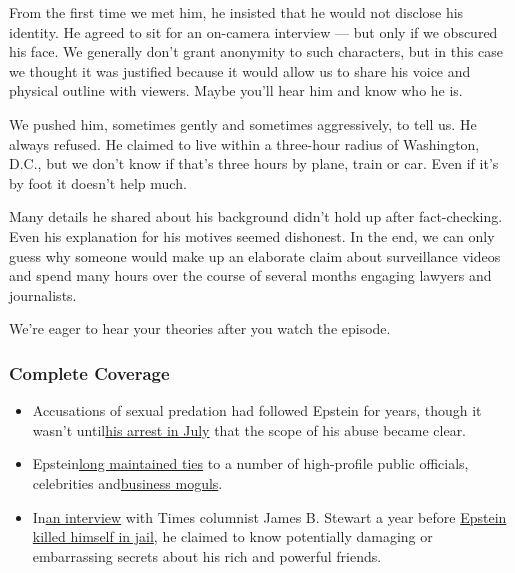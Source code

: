From the first time we met him, he insisted that he would not disclose
his identity. He agreed to sit for an on-camera interview --- but only
if we obscured his face. We generally don't grant anonymity to such
characters, but in this case we thought it was justified because it
would allow us to share his voice and physical outline with viewers.
Maybe you'll hear him and know who he is.

We pushed him, sometimes gently and sometimes aggressively, to tell us.
He always refused. He claimed to live within a three-hour radius of
Washington, D.C., but we don't know if that's three hours by plane,
train or car. Even if it's by foot it doesn't help much.

Many details he shared about his background didn't hold up after
fact-checking. Even his explanation for his motives seemed dishonest. In
the end, we can only guess why someone would make up an elaborate claim
about surveillance videos and spend many hours over the course of
several months engaging lawyers and journalists.

We're eager to hear your theories after you watch the episode.

\hypertarget{complete-coverage}{%
\subsubsection{\texorpdfstring{\textbf{Complete
Coverage}}{Complete Coverage}}\label{complete-coverage}}

\begin{itemize}
\tightlist
\item
  Accusations of sexual predation had followed Epstein for years, though
  it wasn't
  until\href{https://www.nytimes3xbfgragh.onion/2019/07/07/nyregion/jeffrey-epstein-sex-trafficking.html}{his
  arrest in July} that the scope of his abuse became clear.
\end{itemize}

\begin{itemize}
\tightlist
\item
  Epstein\href{https://www.nytimes3xbfgragh.onion/2019/07/13/nyregion/jeffrey-epstein-new-york-elite.html}{long
  maintained ties} to a number of high-profile public officials,
  celebrities
  and\href{https://www.nytimes3xbfgragh.onion/2019/07/25/business/jeffrey-epstein-wexner-victorias-secret.html}{business
  moguls}.
\end{itemize}

\begin{itemize}
\tightlist
\item
  In\href{https://www.nytimes3xbfgragh.onion/2019/08/12/business/jeffrey-epstein-interview.html}{an
  interview} with Times columnist James B. Stewart a year before
  \href{https://www.nytimes3xbfgragh.onion/2019/08/17/nyregion/epstein-suicide-death.html}{Epstein
  killed himself in jail}, he claimed to know potentially damaging or
  embarrassing secrets about his rich and powerful friends.
\end{itemize}

